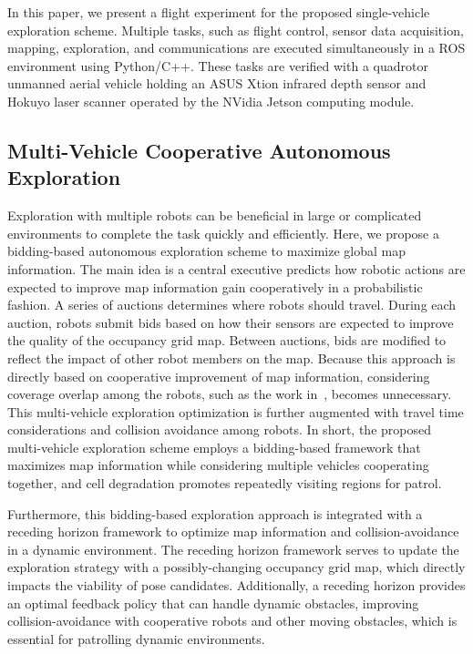 \documentclass[smallextended]{svjour3}       %
\begin{document}
In this paper, we present a flight experiment for the proposed single-vehicle exploration scheme. Multiple tasks, such as flight control, sensor data acquisition, mapping, exploration, and communications are executed simultaneously in a ROS environment using Python/C++. These tasks are verified with a quadrotor unmanned aerial vehicle holding an ASUS Xtion infrared depth sensor and Hokuyo laser scanner operated by the NVidia Jetson computing module. 


\subsection{Multi-Vehicle Cooperative Autonomous Exploration}

Exploration with multiple robots can be beneficial in large or complicated environments to complete the task quickly and efficiently. Here, we propose a bidding-based autonomous exploration scheme to maximize global map information. The main idea is a central executive predicts how robotic actions are expected to improve map information gain cooperatively in a probabilistic fashion. A series of auctions determines where robots should travel. During each auction, robots submit bids based on how their sensors are expected to improve the quality of the occupancy grid map. Between auctions, bids are modified to reflect the impact of other robot members on the map. Because this approach is directly based on cooperative improvement of map information, considering coverage overlap among the robots, such as the work in~\cite{SimApfBurFoxMooThrYou00}, becomes unnecessary. This multi-vehicle exploration optimization is further augmented with travel time considerations and collision avoidance among robots. In short, the proposed multi-vehicle exploration scheme employs a bidding-based framework that maximizes map information while considering multiple vehicles cooperating together, and cell degradation promotes repeatedly visiting regions for patrol.

Furthermore, this bidding-based exploration approach is integrated with a receding horizon framework to optimize map information and collision-avoidance in a dynamic environment. The receding horizon framework serves to update the exploration strategy with a possibly-changing occupancy grid map, which directly impacts the viability of pose candidates. Additionally, a receding horizon provides an optimal feedback policy that can handle dynamic obstacles, improving collision-avoidance with cooperative robots and other moving obstacles, which is essential for patrolling dynamic environments.
\end{document}
